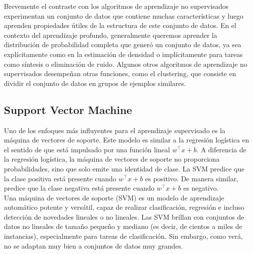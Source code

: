 Brevemente el contraste con los algoritmos de aprendizaje no supervisados experimentan un 
conjunto de datos que contiene muchas características y luego aprenden propiedades útiles de 
la estructura de este conjunto de datos. En el contexto del aprendizaje profundo, generalmente 
queremos aprender la distribución de probabilidad completa que generó un conjunto de datos, ya 
sea explícitamente como en la estimación de densidad o implícitamente para tareas como síntesis 
o eliminación de ruido. Algunos otros algoritmos de aprendizaje no supervisados desempeñan otras 
funciones, como el clustering, que consiste en dividir el conjunto de datos en grupos de 
ejemplos similares.\cite{Goodfellow-et-al-2016}\\


\subsection{Support Vector Machine}

Uno de los enfoques más influyentes para el aprendizaje supervisado es la máquina de vectores 
de soporte. Este modelo es similar a la regresión logística en el sentido de que está 
impulsado por una función lineal $w^{\intercal} x + b$. A diferencia de la regresión logística, 
la máquina de vectores de soporte no proporciona probabilidades, sino que solo emite una 
identidad de clase. La SVM predice que la clase positiva está presente cuando 
$w^{\intercal} x + b$ es positivo. De manera similar, predice que la clase negativa está 
presente cuando $w^{\intercal} x + b$ es negativo.\cite{Goodfellow-et-al-2016} \\ 

Una máquina de vectores de soporte (SVM) es un modelo de aprendizaje automático potente y 
versátil, capaz de realizar clasificación, regresión e incluso detección de novedades 
lineales o no lineales. Las SVM brillan con conjuntos de datos no lineales de tamaño pequeño 
y mediano (es decir, de cientos a miles de instancias), especialmente para tareas de 
clasificación. Sin embargo, como verá, no se adaptan muy bien a conjuntos de datos 
muy grandes. \cite{géron2022hands}\\ 


